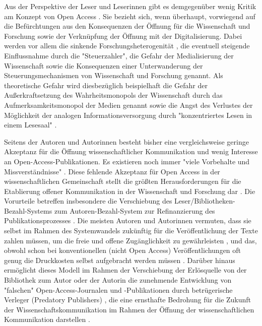 Aus der Perspektive der Leser und Leserinnen gibt es demgegenüber wenig Kritik am Konzept von Open Access \cite[:287]{Wein_2010} \cite{Weishaupt_2009}. Sie bezieht sich, wenn überhaupt, vorwiegend auf die Befürchtungen aus den Konsequenzen der Öffnung für die Wissenschaft und Forschung sowie der Verknüpfung der Öffnung mit der Digitalisierung. Dabei werden vor allem die sinkende Forschungsheterogenität \cite{Hirschi_2015}, die eventuell steigende Einflussnahme durch die "Steuerzahler", die Gefahr der Medialisierung der Wissenschaft \cite{Weingart_2005} sowie die Konsequenzen einer Unterwanderung der Steuerungsmechanismen von Wissenschaft und Forschung genannt. Als theoretische Gefahr wird diesbezüglich beispielhaft die Gefahr der Außerkraftsetzung des Wahrheitsmonopols der Wissenschaft durch das Aufmerksamkeitsmonopol der Medien genannt \cite{Weingart_2005} sowie die Angst des Verlustes der Möglichkeit der analogen Informationsversorgung durch "konzentriertes Lesen in einem Lesesaal" \cite{Winkler_2011}.

Seitens der Autoren und Autorinnen besteht bisher eine vergleichsweise geringe Akzeptanz für die Öffnung wissenschaftlicher Kommunikation und wenig Interesse an Open-Access-Publikationen. Es existieren noch immer "viele Vorbehalte und Missverständnisse" \cite{Suber_2002}. Diese fehlende Akzeptanz für Open Access in der wissenschaftlichen Gemeinschaft stellt die größten Herausforderungen für die Etablierung offener Kommunikation in der Wissenschaft und Forschung dar \cite{Weishaupt_2009}. Die Vorurteile betreffen insbesondere die Verschiebung des Leser/Bibliotheken-Bezahl-Systems zum Autoren-Bezahl-System zur Refinanzierung des Publikationsprozesses \cite{European_Commission_2006} \cite{Chibnik_2015}. Die meisten Autoren und Autorinnen vermuten, dass sie selbst im Rahmen des Systemwandels zukünftig für die Veröffentlichung der Texte zahlen müssen, um die freie und offene Zugänglichkeit zu gewährleisten \cite{Mussell_2013}, und das, obwohl schon bei konventionellen (nicht Open Access) Veröffentlichungen oft genug die Druckkosten selbst aufgebracht werden müssen \cite{Weishaupt_2009}. Darüber hinaus ermöglicht dieses Modell im Rahmen der Verschiebung der Erlösquelle von der Bibliothek zum Autor oder der Autorin die zunehmende Entwicklung von "falschen" Open-Access-Journalen und -Publikationen durch betrügerische Verleger (Predatory Publishers) \cite{Beall_2015}, die eine ernsthafte Bedrohung für die Zukunft der Wissenschaftskommunikation im Rahmen der Öffnung der wissenschaftlichen Kommunikation darstellen \cite{Beall_2012}.

